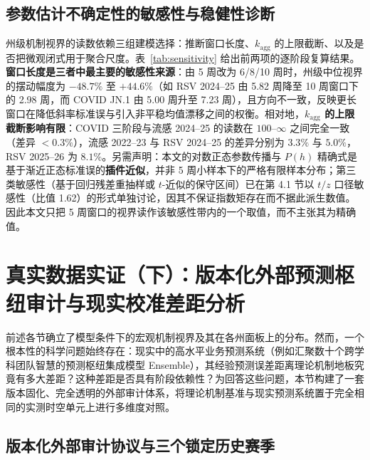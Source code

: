 \documentclass[10pt,a4paper]{article}
\theoremstyle{plain}
\theoremstyle{definition}
\begin{document}
\subsection{参数估计不确定性的敏感性与稳健性诊断}\label{sec:sensitivity}

州级机制视界的读数依赖三组建模选择：推断窗口长度、$k_{\text{agg}}$ 的上限截断、以及是否把微观闭式用于聚合尺度。表~\ref{tab:sensitivity} 给出前两项的逐阶段复算结果。\textbf{窗口长度是三者中最主要的敏感性来源}：由 5 周改为 6/8/10 周时，州级中位视界的摆动幅度为 $-48.7\%$ 至 $+44.6\%$（如 RSV 2024--25 由 5.82 周降至 10 周窗口下的 2.98 周，而 COVID JN.1 由 5.00 周升至 7.23 周），且方向不一致，反映更长窗口在降低斜率标准误与引入非平稳均值漂移之间的权衡。相对地，\textbf{$k_{\text{agg}}$ 的上限截断影响有限}：COVID 三阶段与流感 2024--25 的读数在 $100$--$\infty$ 之间完全一致（差异 $<0.3\%$），流感 2022--23 与 RSV 2024--25 的差异分别为 $3.3\%$ 与 $5.0\%$，RSV 2025--26 为 $8.1\%$。另需声明：本文的对数正态参数传播与 $P(h)$ 精确式是基于渐近正态标准误的\textbf{插件近似}，并非 5 周小样本下的严格有限样本分布；第三类敏感性（基于回归残差重抽样或 $t$-近似的保守区间）已在第 4.1 节以 $t/z$ 口径敏感性（比值 1.62）的形式单独讨论，因其不保证指数矩存在而不据此派生数值。因此本文只把 5 周窗口的视界读作该敏感性带内的一个取值，而不主张其为精确值。


\section{真实数据实证（下）：版本化外部预测枢纽审计与现实校准差距分析}\label{sec:hub_audit}

前述各节确立了模型条件下的宏观机制视界及其在各州面板上的分布。然而，一个根本性的科学问题始终存在：现实中的高水平业务预测系统（例如汇聚数十个跨学科团队智慧的预测枢纽集成模型 Ensemble），其经验预测误差距离理论机制地板究竟有多大差距？这种差距是否具有阶段依赖性？为回答这些问题，本节构建了一套版本固化、完全透明的外部审计体系，将理论机制基准与现实预测系统置于完全相同的实测时空单元上进行多维度对照。

\subsection{版本化外部审计协议与三个锁定历史赛季}\label{sec:flusight_protocol}
\end{document}
